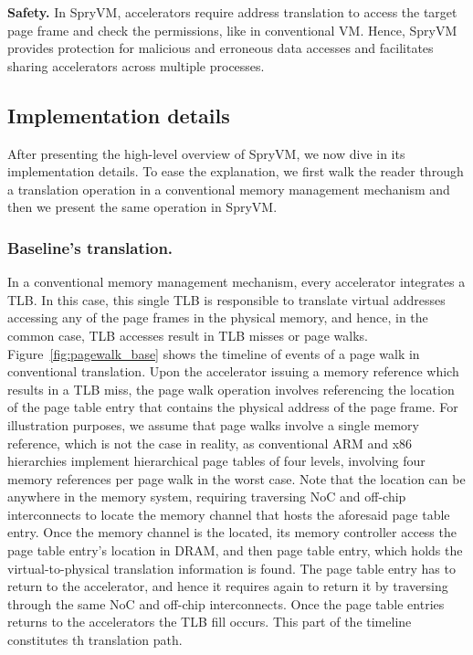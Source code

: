 \noindent\textbf{Safety.} In SpryVM, accelerators require address translation to access the target page frame and check the permissions, like in conventional VM. Hence, SpryVM provides protection for malicious and erroneous data accesses and facilitates sharing accelerators across multiple processes.

\subsection{Implementation details}

After presenting the high-level overview of SpryVM, we now dive in its implementation details. To ease the explanation, we first walk the reader through a translation operation in a conventional memory management mechanism and then we present the same operation in SpryVM.

\subsubsection{Baseline's translation.}

In a conventional memory management mechanism, every accelerator integrates a TLB. In this case, this single TLB is responsible to translate virtual addresses accessing any of the page frames in the physical memory, and hence, in the common case, TLB accesses result in TLB misses or page walks. Figure~\ref{fig:pagewalk_base} shows the timeline of events of a page walk in conventional translation. Upon the accelerator issuing a memory reference which results in a TLB miss, the page walk operation involves referencing the location of the page table entry that contains the physical address of the page frame. For illustration purposes, we assume that page walks involve a single memory reference, which is not the case in reality, as conventional ARM and x86 hierarchies implement hierarchical page tables of four levels, involving four memory references per page walk in the worst case. Note that the location can be anywhere in the memory system, requiring traversing NoC and off-chip interconnects to locate the memory channel that hosts the aforesaid page table entry. Once the memory channel is the located, its memory controller access the page table entry's location in DRAM, and then page table entry, which holds the virtual-to-physical translation information is found. The page table entry has to return to the accelerator, and hence it requires again to return it by traversing through the same NoC and off-chip interconnects. Once the page table entries returns to the accelerators the TLB fill occurs. This part of the timeline constitutes th translation path. 

